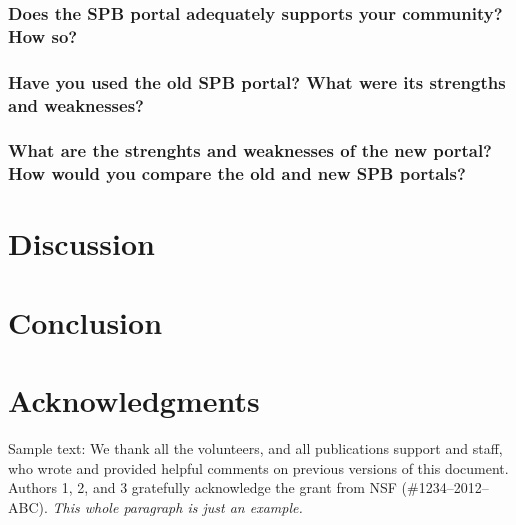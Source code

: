 \documentclass{sigchi}
\begin{document}
\subsubsection{Does the SPB portal adequately supports your community? How so?}
\subsubsection{Have you used the old SPB portal? What were its strengths and weaknesses?}
\subsubsection{What are the strenghts and weaknesses of the new portal? How would you compare the old and new SPB portals?}


\section{Discussion}

\section{Conclusion}

\section{Acknowledgments}

Sample text: We thank all the volunteers, and all publications support
and staff, who wrote and provided helpful comments on previous
versions of this document. Authors 1, 2, and 3 gratefully acknowledge
the grant from NSF (\#1234--2012--ABC). \textit{This whole paragraph is
  just an example.}


%
%
%
%
%
\balance{}



\end{document}
